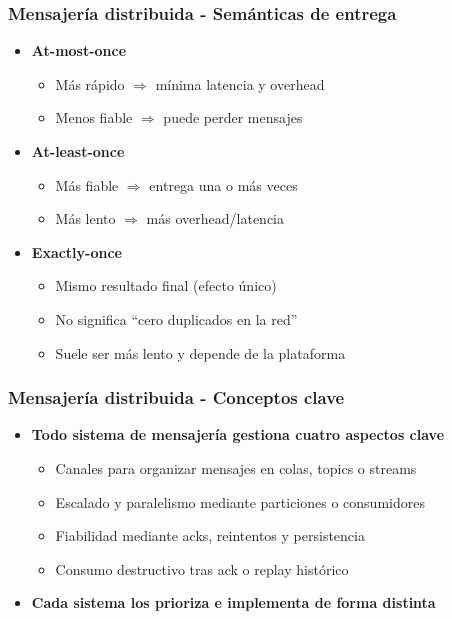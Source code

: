 \documentclass[aspectratio=169]{beamer}
\begin{document}
\begin{frame}
\frametitle{Mensajería distribuida - Semánticas de entrega}
\begin{itemize}
  \item \textbf{At-most-once}
  \begin{itemize}
    \item Más rápido $\Rightarrow$ mínima latencia y overhead
    \item Menos fiable $\Rightarrow$ puede perder mensajes
  \end{itemize}

  \vspace{0.5em}

  \item \textbf{At-least-once}
  \begin{itemize}
    \item Más fiable $\Rightarrow$ entrega una o más veces
    \item Más lento $\Rightarrow$ más overhead/latencia
  \end{itemize}

  \vspace{0.5em}

  \item \textbf{Exactly-once}
  \begin{itemize}
    \item Mismo resultado final (efecto único)
    \item No significa ``cero duplicados en la red''
    \item Suele ser más lento y depende de la plataforma
  \end{itemize}
\end{itemize}
\end{frame}

\begin{frame}
\frametitle{Mensajería distribuida - Conceptos clave}
\begin{itemize}
  \item \textbf{Todo sistema de mensajería gestiona cuatro aspectos clave}
  \begin{itemize}
    \item Canales para organizar mensajes en colas, topics o streams
    \item Escalado y paralelismo mediante particiones o consumidores
    \item Fiabilidad mediante acks, reintentos y persistencia
    \item Consumo destructivo tras ack o replay histórico
  \end{itemize}

  \vspace{1em}

  \item \textbf{Cada sistema los prioriza e implementa de forma distinta}
\end{itemize}
\end{frame}
\end{document}
